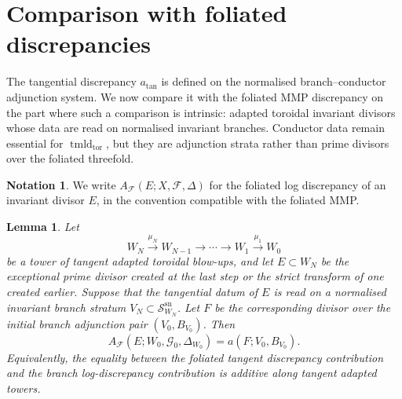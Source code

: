\documentclass[11pt]{amsart}
\numberwithin{equation}{section}
\theoremstyle{plain}
\newtheorem{Lemma}[Theorem]{Lemma}
\theoremstyle{definition}
\newtheorem{Notation}[Theorem]{Notation}
\newcommand{\tmldtor}{\operatorname{tmld}_{\mathrm{tor}}}
\newcommand{\sn}{\mathrm{sn}}
\newcommand{\AF}{A_{\mathcal F}}
\newcommand{\cF}{\mathcal F}
\newcommand{\cG}{\mathcal G}
\newcommand{\sS}{\mathscr S}
\begin{document}
\section{Comparison with foliated discrepancies}
\label{sec:foliated-comparison}

The tangential discrepancy $a_{\tan}$ is defined on the normalised
branch--conductor adjunction system.  We now compare it with the foliated MMP
discrepancy on the part where such a comparison is intrinsic: adapted
toroidal invariant divisors whose data are read on normalised invariant
branches.  Conductor data remain essential for $\tmldtor$, but they are
adjunction strata rather than prime divisors over the foliated threefold.

\begin{Notation}
We write $\AF(E;X,\cF,\Delta)$ for the foliated log discrepancy of an
invariant divisor $E$, in the convention compatible with the foliated MMP.
\end{Notation}

\begin{Lemma} 
\label{lem:foliated-discrepancy-additivity}
Let
\[
W_N\xrightarrow{\mu_N}W_{N-1}\longrightarrow\cdots\longrightarrow
W_1\xrightarrow{\mu_1}W_0
\]
be a tower of tangent adapted toroidal blow-ups, and let $E\subset W_N$ be
the exceptional prime divisor created at the last step or the strict transform
of one created earlier.  Suppose that the tangential datum of $E$ is read on a
normalised invariant branch stratum $V_N\subset\sS_{W_N}^{\sn}$.  Let $F$ be
the corresponding divisor over the initial branch adjunction pair
$(V_0,B_{V_0})$.  Then
\[
\AF(E;W_0,\cG_0,\Delta_{W_0})=a(F;V_0,B_{V_0}).
\]
Equivalently, the equality between the foliated tangent discrepancy
contribution and the branch log-discrepancy contribution is additive along
tangent adapted towers.
\end{Lemma}
\end{document}
